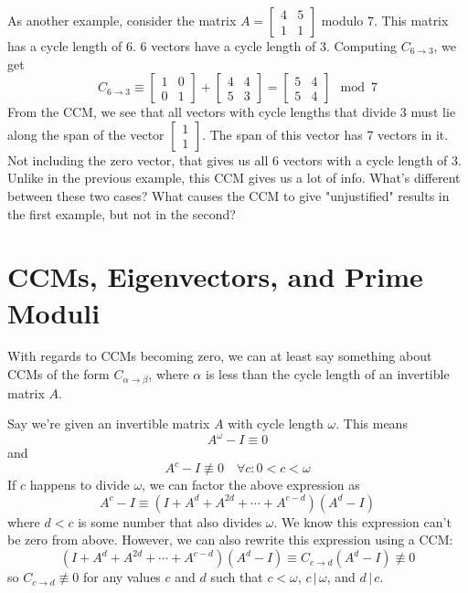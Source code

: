 \documentclass[a4paper, 12pt, reqno]{amsart}
\begin{document}
	As another example, consider the matrix $A = 
	\left[
		\begin{smallmatrix}
			4 & 5 \\
			1 & 1
		\end{smallmatrix}
	\right]$ modulo 7. This matrix has a cycle length of 6. 6 vectors have a cycle length of 3. Computing $C_{6 \rightarrow 3}$, we get
	\[
		C_{6 \rightarrow 3} \equiv 
		\begin{bmatrix}
			1 & 0 \\
			0 & 1
		\end{bmatrix} +
		\begin{bmatrix}
			4 & 4 \\
			5 & 3
		\end{bmatrix} = 
		\begin{bmatrix}
			5 & 4 \\
			5 & 4
		\end{bmatrix} \mod{7}
	\]
	From the CCM, we see that all vectors with cycle lengths that divide 3 must lie along the span of the vector
	$\left[
		\begin{smallmatrix}
			1 \\
			1
		\end{smallmatrix}
	\right]$. The span of this vector has 7 vectors in it. Not including the zero vector, that gives us all 6 vectors with a cycle length of 3. Unlike in the
	previous example, this CCM gives us a lot of info. What's different between these two cases? What causes the CCM to give "unjustified" results in the first example,
	but not in the second?
	
	\section{CCMs, Eigenvectors, and Prime Moduli}
	With regards to CCMs becoming zero, we can at least say something about CCMs of the form $C_{\alpha\rightarrow\beta}$, where $\alpha$ is less than the cycle length of an
	invertible matrix $A$.
	
	Say we're given an invertible matrix $A$ with cycle length $\omega$. This means
	\[
		A^\omega - I \equiv 0
	\]
	and
	\[
		A^c - I \not\equiv 0 \quad \forall c : 0 < c < \omega
	\]
	If $c$ happens to divide $\omega$, we can factor the above expression as
	\[
		A^c - I \equiv (I + A^d + A^{2d} + \cdots + A^{c-d})(A^d - I)
	\]
	where $d < c$ is some number that also divides $\omega$. We know this expression can't be zero from above. However, we can also rewrite this expression using a CCM:
	\[
		(I + A^d + A^{2d} + \cdots + A^{c-d})(A^d - I) \equiv C_{c\rightarrow d}(A^d - I) \not\equiv 0
	\]
	so $C_{c\rightarrow d} \not\equiv 0$ for any values $c$ and $d$ such that $c < \omega$, $c\,|\,\omega$, and $d\,|\,c$.
	
\end{document}
